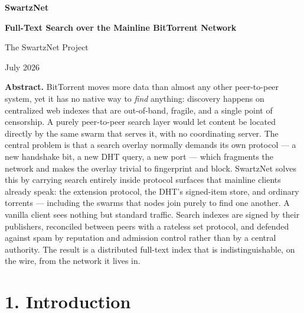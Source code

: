 \documentclass[11pt]{article}
\begin{document}
\begin{center}
  {\LARGE\bfseries SwartzNet\par}
  \vspace{0.35em}
  {\large\bfseries Full-Text Search over the Mainline BitTorrent Network\par}
  \vspace{0.9em}
  {\normalsize The SwartzNet Project\par}
  \vspace{0.25em}
  {\normalsize July 2026\par}
\end{center}
\vspace{0.4em}

\begin{center}
\begin{minipage}{0.86\textwidth}
\small\setlength{\parindent}{0pt}
\textbf{Abstract.} BitTorrent moves more data than almost any other
peer-to-peer system, yet it has no native way to \emph{find} anything:
discovery happens on centralized web indexes that are out-of-band,
fragile, and a single point of censorship. A purely peer-to-peer search
layer would let content be located directly by the same swarm that
serves it, with no coordinating server. The central problem is that a
search overlay normally demands its own protocol --- a new handshake
bit, a new DHT query, a new port --- which fragments the network and
makes the overlay trivial to fingerprint and block. SwartzNet solves
this by carrying search entirely inside protocol surfaces that mainline
clients already speak: the extension protocol, the DHT's signed-item
store, and ordinary torrents --- including the swarms that nodes join
purely to find one another. A vanilla client sees nothing but standard
traffic. Search indexes are signed by their publishers, reconciled
between peers with a rateless set protocol, and defended against spam by
reputation and admission control rather than by a central authority. The
result is a distributed full-text index that is indistinguishable, on
the wire, from the network it lives in.
\end{minipage}
\end{center}
\vspace{1.1em}

\hypertarget{introduction}{%
\section{1. Introduction}\label{introduction}}
\end{document}
